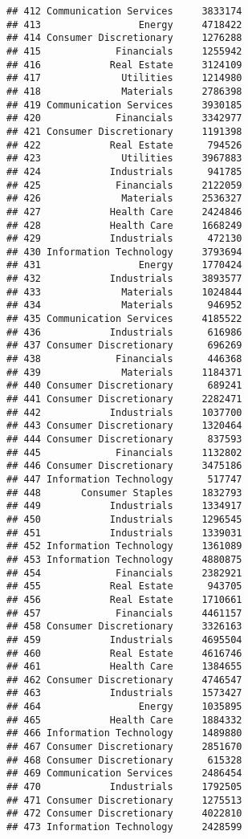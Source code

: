 \documentclass[
]{article}
\begin{document}
\begin{verbatim}
## 412 Communication Services     3833174
## 413                 Energy     4718422
## 414 Consumer Discretionary     1276288
## 415             Financials     1255942
## 416            Real Estate     3124109
## 417              Utilities     1214980
## 418              Materials     2786398
## 419 Communication Services     3930185
## 420             Financials     3342977
## 421 Consumer Discretionary     1191398
## 422            Real Estate      794526
## 423              Utilities     3967883
## 424            Industrials      941785
## 425             Financials     2122059
## 426              Materials     2536327
## 427            Health Care     2424846
## 428            Health Care     1668249
## 429            Industrials      472130
## 430 Information Technology     3793694
## 431                 Energy     1770424
## 432            Industrials     3893577
## 433              Materials     1024844
## 434              Materials      946952
## 435 Communication Services     4185522
## 436            Industrials      616986
## 437 Consumer Discretionary      696269
## 438             Financials      446368
## 439              Materials     1184371
## 440 Consumer Discretionary      689241
## 441 Consumer Discretionary     2282471
## 442            Industrials     1037700
## 443 Consumer Discretionary     1320464
## 444 Consumer Discretionary      837593
## 445             Financials     1132802
## 446 Consumer Discretionary     3475186
## 447 Information Technology      517747
## 448       Consumer Staples     1832793
## 449            Industrials     1334917
## 450            Industrials     1296545
## 451            Industrials     1339031
## 452 Information Technology     1361089
## 453 Information Technology     4880875
## 454             Financials     2382921
## 455            Real Estate      943705
## 456            Real Estate     1710661
## 457             Financials     4461157
## 458 Consumer Discretionary     3326163
## 459            Industrials     4695504
## 460            Real Estate     4616746
## 461            Health Care     1384655
## 462 Consumer Discretionary     4746547
## 463            Industrials     1573427
## 464                 Energy     1035895
## 465            Health Care     1884332
## 466 Information Technology     1489880
## 467 Consumer Discretionary     2851670
## 468 Consumer Discretionary      615328
## 469 Communication Services     2486454
## 470            Industrials     1792505
## 471 Consumer Discretionary     1275513
## 472 Consumer Discretionary     4022810
## 473 Information Technology     2428599

\end{verbatim}
\end{document}
